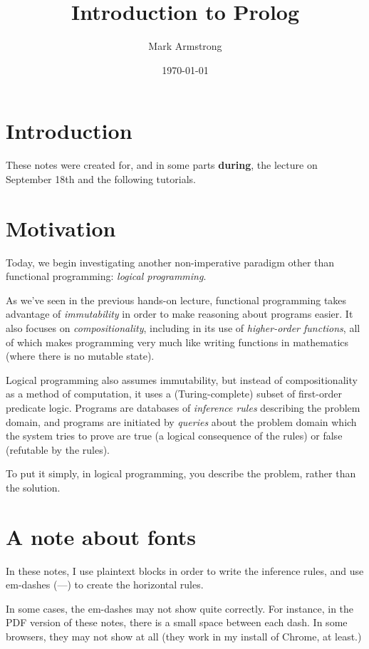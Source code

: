 \documentclass[11pt]{article}
\author{Mark Armstrong}
\date{\today}
\title{Introduction to Prolog}
\begin{document}
\maketitle
\tableofcontents


\section{Introduction}
\label{sec:org60741fd}
These notes were created for, and in some parts \textbf{during},
the lecture on September 18th and the following tutorials.

\section{Motivation}
\label{sec:orge39c809}
Today, we begin investigating another non-imperative paradigm
other than functional programming: \emph{logical programming}.

As we've seen in the previous hands-on lecture,
functional programming takes advantage of \emph{immutability} in order
to make reasoning about programs easier.
It also focuses on \emph{compositionality}, including
in its use of \emph{higher-order functions}, all of which
makes programming very much like writing functions in mathematics
(where there is no mutable state).

Logical programming also assumes immutability,
but instead of compositionality as a method of computation,
it uses a (Turing-complete) subset of first-order predicate logic.
Programs are databases of \emph{inference rules} describing the problem domain,
and programs are initiated by \emph{queries} about the problem domain which
the system tries to prove are true (a logical consequence of the rules)
or false (refutable by the rules).

To put it simply, in logical programming, you describe the problem,
rather than the solution.

\section{A note about fonts}
\label{sec:org16e64f4}
In these notes, I use plaintext blocks in order to write the
inference rules, and use em-dashes (—) to create the horizontal rules.

In some cases, the em-dashes may not show quite correctly.
For instance, in the PDF version of these notes, there is
a small space between each dash. In some browsers, they
may not show at all (they work in my install of Chrome, at least.)
\end{document}
